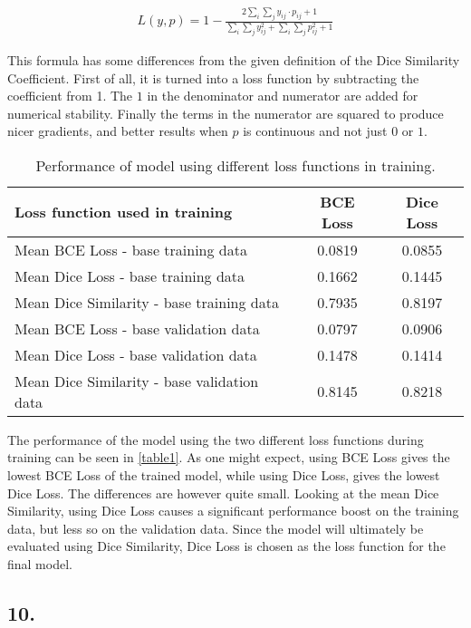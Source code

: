\documentclass[a4paper, 12pt]{article}
\begin{document}
\begin{align}
	L(y, p) = 1 - \frac{2 \sum_i \sum_j y_{ij} \cdot p_{ij} + 1}{\sum_i \sum_j y_{ij}^2 + \sum_i \sum_j p_{ij}^2 + 1}
\end{align}

This formula has some differences from the given definition of the Dice Similarity Coefficient. First of all, it is turned into a loss function by subtracting the coefficient from 1. The $1$ in the denominator and numerator are added for numerical stability. Finally the terms in the numerator are squared to produce nicer gradients, and better results when $p$ is continuous and not just $0$ or $1$.

\begin{table}[H]
	\centering
	\begin{tabular}{|l||c|c|}
		\hline
		Loss function used in training & BCE Loss & Dice Loss\\
		\hline\hline
		Mean BCE Loss - base training data & 0.0819 & 0.0855\\
		\hline
		Mean Dice Loss - base training data & 0.1662 & 0.1445\\
		\hline
		Mean Dice Similarity - base training data & 0.7935 & 0.8197\\
		\hline\hline
		Mean BCE Loss - base validation data & 0.0797 & 0.0906\\
		\hline
		Mean Dice Loss - base validation data & 0.1478 & 0.1414\\
		\hline
		Mean Dice Similarity - base validation data & 0.8145 & 0.8218\\
		\hline
	\end{tabular}
	\caption{Performance of model using different loss functions in training.}
	\label{table1}
\end{table}

The performance of the model using the two different loss functions during training can be seen in \autoref{table1}. As one might expect, using BCE Loss gives the lowest BCE Loss of the trained model, while using Dice Loss, gives the lowest Dice Loss. The differences are however quite small. Looking at the mean Dice Similarity, using Dice Loss causes a significant performance boost on the training data, but less so on the validation data. Since the model will ultimately be evaluated using Dice Similarity, Dice Loss is chosen as the loss function for the final model.

\subsection{10.}
\end{document}
